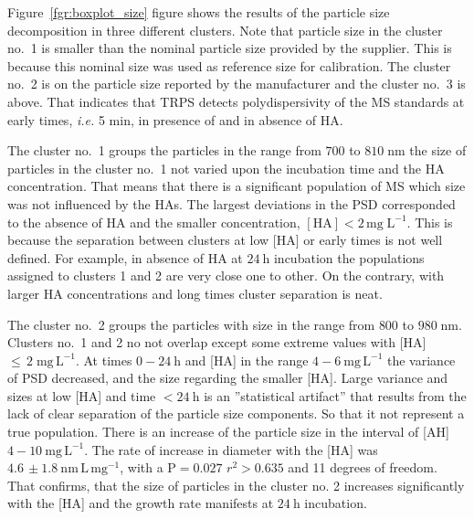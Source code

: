\documentclass[journal=langd5,manuscript=article]{achemso}
\begin{document}
Figure~\ref{fgr:boxplot_size} figure  shows the results of the particle size decomposition in three
different clusters. Note that particle size in the cluster no.~1 is smaller than the nominal particle size provided by the supplier. This is because this nominal size was used as reference size for calibration.  
The cluster no.~2 is on the particle size reported by the manufacturer and the cluster no.~3 is above.
That indicates that TRPS
detects polydispersivity of the MS standards at early times, {\em i.e.} 5 min, in presence of  and in absence of HA.


The cluster no.~1 groups the particles in the range from $700$ to $810\;\mathrm{nm}$
the size of particles in the cluster no.~1 not varied upon the incubation time and the HA concentration. That means that there is a significant population of MS which size was not influenced by the HAs.
The largest deviations in the PSD corresponded to the absence of HA and the smaller concentration, 
$\mathrm{[HA]  < 2\,mg\;L^{-1}}$.
This is because the separation between clusters at low [HA] or early times is not well defined. For example, in absence of HA at $24~\mathrm{h}$ incubation the populations assigned to clusters 1 and 2 are very close one to other. On the contrary, with larger HA concentrations and long  times cluster separation is neat.


The cluster no.~2 groups the particles with size in the range from $800$ to $980\;\mathrm{nm}$.
Clusters no.~1 and 2 no not overlap except some extreme values with [HA]$\leq\, 2\;\mathrm{mg\,L^{-1}}$. At times $0 - 24~\mathrm{h}$ and
[HA] in the range $4 - 6~\mathrm{mg\, L^{-1}}$ the variance of PSD decreased, and the size regarding the smaller [HA].
Large variance  and sizes at low [HA] and time $< 24~\mathrm{h}$ is an ''statistical artifact'' that results from the lack of clear separation of the particle size components. So that it not represent a true population.
There is an increase of the particle size in the interval
of [AH] $4-10~\mathrm{mg\,L^{-1}}$.
The rate of increase in diameter with the [HA] was
$4.6\,\pm 1.8~\mathrm{nm\,L\,mg^{-1}}$, with a $\mathrm{P = 0.027}$ $r^2 > 0.635$ and 11 degrees of freedom. 
That confirms, that the size of particles in the cluster no. 2 increases significantly with the [HA] and the growth rate manifests at $24~\mathrm{h}$ incubation.
\end{document}
